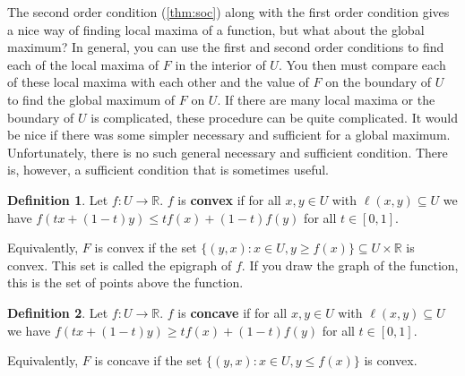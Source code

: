 \documentclass[12pt,reqno]{amsart}
\theoremstyle{definition}
\newtheorem{definition}{Definition}[section]
\def\R{\mathbb{R}}
\renewcommand{\to}{{\rightarrow}}
\begin{document}
The second order condition (\ref{thm:soc}) along with the first order
condition gives a nice way of finding local maxima of a function, but
what about the global maximum?  In general, you can use the first and
second order conditions to find each of the local maxima of $F$ in the
interior of $U$. You then must compare each of these local maxima with
each other and the value of $F$ on the boundary of $U$ to find the
global maximum of $F$ on $U$. If there are many local maxima or the
boundary of $U$ is complicated, these procedure can be quite
complicated. It would be nice if there was some simpler necessary and
sufficient for a global maximum. Unfortunately, there is no such
general necessary and sufficient condition. There is, however, a
sufficient condition that is sometimes useful.
\begin{definition}
  Let $f:U \to \R$. $f$ is \textbf{convex} if for all $x,y \in U$ with
  $\ell(x,y) \subseteq U$ we have $f(tx + (1-t)y) \leq tf(x) + (1-t)
  f(y)$ for all $t \in [0,1]$.
\end{definition}
Equivalently, $F$ is convex if the set $\{(y,x): x \in U, y \geq
f(x)\} \subseteq U \times \R$ is convex. This set is called the
epigraph of $f$. If you draw the graph of the function, this is the
set of points above the function.
\begin{definition}
  Let $f:U \to \R$. $f$ is \textbf{concave} if for all $x,y \in U$ with
  $\ell(x,y) \subseteq U$ we have $f(tx + (1-t)y) \geq tf(x) + (1-t)
  f(y)$ for all $t \in [0,1]$.
\end{definition}
Equivalently, $F$ is concave if the set $\{(y,x): x \in U, y \leq
f(x)\}$ is convex.
\end{document}
